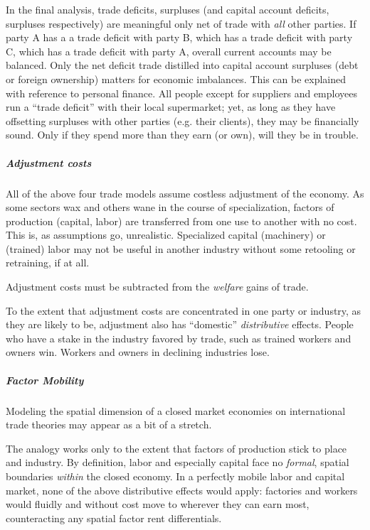 In the final analysis, trade deficits, surpluses (and capital account deficits, surpluses respectively) are meaningful only net of trade with \emph{all} other parties. If party A has a a trade deficit with party B, which has a trade deficit with party C, which has a trade deficit with party A, overall current accounts may be balanced. Only the net deficit trade distilled into capital account surpluses (debt or foreign ownership) matters for economic imbalances. This can be explained with reference to personal finance. All people except for suppliers and employees run a ``trade deficit'' with their local supermarket; yet, as long as they have offsetting surpluses with other parties (e.g. their clients), they may be financially sound. Only if they spend more than they earn (or own), will they be in trouble.%

\subparagraph{Adjustment costs}  \label{sec:adjustmentcosts}
All of the above four trade models assume costless adjustment of the economy. As some sectors wax and others wane in the course of specialization, factors of production (capital, labor) are transferred from one use to another with no cost. This is, as assumptions go, unrealistic. Specialized capital (machinery) or (trained) labor may not be useful in another industry without some retooling or retraining, if at all. 

Adjustment costs must be subtracted from the \emph{welfare} gains of trade.

To the extent that adjustment costs are concentrated in one party or industry, as they are likely to be, adjustment also has ``domestic'' \emph{distributive} effects. People who have a stake in the industry favored by trade, such as trained workers and owners win. Workers and owners in declining industries lose.

\subparagraph{Factor Mobility}  \label{sec:factormobilitytrade}
Modeling the spatial dimension of a closed market economies on international trade theories may appear as a bit of a stretch. 

The analogy works only to the extent that factors of production stick to place and industry. By definition, labor and especially capital face no \emph{formal}, spatial boundaries \emph{within} the closed economy. In a perfectly mobile labor and capital market, none of the above distributive effects would apply: factories and workers would fluidly and without cost move to wherever they can earn most, counteracting any spatial factor rent differentials. 

